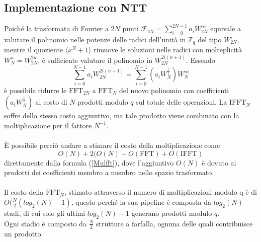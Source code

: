 \subsection{Implementazione con NTT}
Poiché la trasformata di Fourier a $2N$ punti
$\mathcal{F}_{2N} = \displaystyle\sum_{i=0}^{2N-1}a_i W_{2N}^{n i}$
equivale a valutare il polinomio nelle potenze delle radici dell'unità in
$\mathbb{Z}_q$ del tipo $W^i_{2N}$, mentre il quoziente $\langle x^N+1\rangle$
rimuove le soluzioni nelle radici con molteplicità \\
$W^n_N = W^{2n}_{2N}$, è sufficiente valutare il polinomio in
$W^{2i(n+1)}_{2N}$. Essendo
\begin{equation*}
    \displaystyle\sum_{i=0}^{N-1}a_i W_{2N}^{2i(n + 1)} =
    \displaystyle\sum_{i=0}^{N-1} (a_i W_N^{\frac{i}{2}}) W_{N}^{n i}
\end{equation*}
è possibile ridurre le $\mathrm{FFT}_{2N}$ a $\mathrm{FFT}_N$ del nuovo
polinomio con coefficienti $(a_i W_N^{\frac{i}{2}})$ al costo di $N$ prodotti
modulo $q$ sul totale delle operazioni. La $\mathrm{IFFT}_N$ soffre dello
stesso costo aggiuntivo, ma tale prodotto viene combinato con la
moltiplicazione per il fattore $N^{-1}$.\\
\\
È possibile perciò andare a stimare il costo della moltiplicazione come
\begin{equation*}
O(N) + 2(O(N) + O(\mathrm{FFT}) + O(\mathrm{IFFT})
\end{equation*}
direttamente dalla formula (\ref{Mulfft}), dove l'aggiuntivo $O(N)$ è dovuto ai
prodotti dei coefficienti membro a membro nello spazio trasformato.\\
\\
Il costo della $\mathrm{FFT}_N$, stimato attraverso il numero di moltiplicazioni modulo
q è di $O(\frac{N}{2}(log_2(N) - 1)$, questo perché la sua pipeline è composta
da $log_2(N)$ stadi, di cui solo gli ultimi $log_2(N) - 1$ generano prodotti
modulo $q$.\\
Ogni stadio è composto da $\frac{N}{2}$ strutture a farfalla, ognuna delle
quali contribuisce un prodotto.\\
\\
\\

